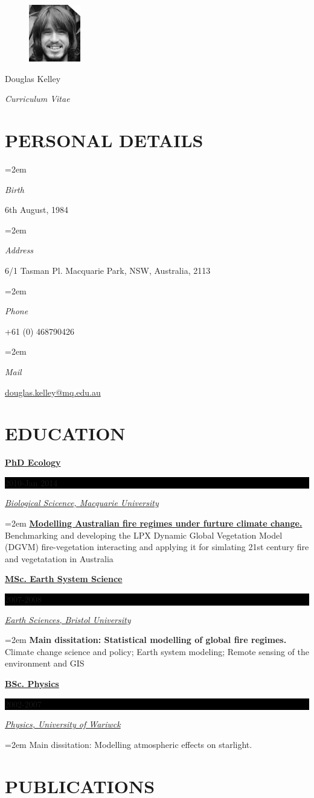 \documentclass[paper=a4,fontsize=11pt]{scrartcl}	 			%
\newlength{\spacebox}
\newcommand{\sepspace}{\vspace*{1em}}			%
\newcommand{\MyName}[1]{
		\Huge \usefont{OT1}{phv}{b}{n} \hfill #1 		%
		\par \normalsize \normalfont}
\newcommand{\MySlogan}[1]{
		\large \usefont{OT1}{phv}{m}{n}\hfill \textit{#1} %
		\par \normalsize \normalfont}
\newcommand{\NewPart}[1]{\section*{\uppercase{#1}}}
\newcommand{\PersonalEntry}[2]{
		\noindent\hangindent=2em\hangafter=0 		%
		\parbox{\spacebox}{						%
		\textit{#1}}								%
		\hspace{1.5em} #2 \par}					%
\newcommand{\EducationEntry}[4]{
		\noindent \textbf{#1} \hfill 					%
		\colorbox{Black}{%
			\parbox{8em}{%
			\hfill\color{White}#2}} \par				%
		\noindent \textit{#3} \par					%
		\noindent\hangindent=2em\hangafter=0 \small #4 	%
		\normalsize \par}
\begin{document}
\begin{figure}
	\vspace*{-4em}
		\includegraphics[width=0.2\textwidth]{Doug-Kelley.jpg}
\end{figure}

\MyName{Douglas Kelley}
\MySlogan{Curriculum Vitae}

\sepspace

\NewPart{Personal details}{}

\PersonalEntry{Birth}{6th August, 1984} 
\PersonalEntry{Address}{6/1 Tasman Pl. Macquarie Park, NSW, Australia, 2113}
\PersonalEntry{Phone}{+61 (0) 468790426}
\PersonalEntry{Mail}{\url{douglas.kelley@mq.edu.au}}

\NewPart{Education}{} 

\EducationEntry{\href{http://bcd.mq.edu.au/?page_id=171}{PhD Ecology}}{2010-Jan 2014}{\href{http://bio.mq.edu.au/}{Biological Scicence, Macquarie University}}
  {\textbf{\href{http://bcd.mq.edu.au/?p=361}{Modelling Australian fire regimes under furture climate change.}} Benchmarking and developing the LPX Dynamic Global Vegetation Model (DGVM) fire-vegetation interacting and applying it for simlating 21st century fire and vegetatation in Australia}
\sepspace

\EducationEntry{\href{http://www.bristol.ac.uk/cabot/postgrad/msc-ccsp.html}
             {MSc. Earth System Science}}{2007-2008}{\href{http://www.bristol.ac.uk/earthsciences/}{Earth Sciences, Bristol University}}
  {\textbf{Main dissitation: Statistical modelling of global fire regimes.} Climate change science and policy; Earth system modeling; Remote sensing of the environment and GIS}
\sepspace

\EducationEntry{\href{http://www2.warwick.ac.uk/study/undergraduate/courses/f300}{BSc. Physics}}{2002-2007}{\href{http://www2.warwick.ac.uk/fac/sci/physics/}{Physics, University of Wariwck}}
  {Main dissitation: Modelling atmospheric effects on starlight.}
  
  
\NewPart{Publications}
\end{document}
